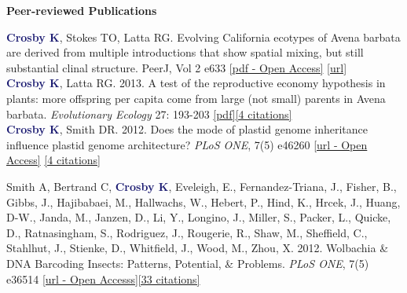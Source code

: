 \documentclass[a4paper,12pt,final]{memoir}
\newcommand{\Sep}{\vspace{1.5em}}
\newcommand{\SmallSep}{\vspace{0.5em}}
\newenvironment{Contact Information}
	{\ignorespaces\textbf{\color{MidnightBlue} Contact Information}}
	{\Sep\ignorespacesafterend}
\newcommand{\CVSection}[1]
	{\Large\textbf{#1}\par
	\SmallSep\normalsize\normalfont}
\begin{document}
\Sep

\CVSection{Peer-reviewed Publications}
\textcolor{MidnightBlue}{\textbf{{Crosby K}}}, Stokes TO, Latta RG. Evolving California ecotypes of Avena barbata are derived from multiple introductions that show spatial mixing, but still substantial clinal structure. PeerJ, Vol 2 e633 \href{https://peerj.com/articles/633.pdf}{[pdf - Open Access]} \href{http://dx.doi.org/10.7717/peerj.633}{[url]}\\

\textcolor{MidnightBlue}{\textbf{{Crosby K}}}, Latta RG. 2013. A test of the reproductive economy hypothesis in plants: more offspring per capita come from large (not small) parents in Avena barbata. \textit{Evolutionary Ecology} 27: 193-203 \href{https://www.researchgate.net/profile/Kate_Crosby/publication/257561503_A_test_of_the_reproductive_economy_hypothesis_in_plants_more_offspring_per_capita_come_from_large_\%28not_small\%29_parents_in_Avena_barbata/links/549893d20cf2519f5a1de721.pdf?origin=publication_detail}{[pdf]}\href{http://scholar.google.ca/scholar?oi=bibs&hl=en&cites=3740505222331803820&as_sdt=5}{[4 citations]}\\

\textcolor{MidnightBlue}{\textbf{{Crosby K}}}, Smith DR. 2012. Does the mode of plastid genome inheritance influence plastid genome architecture?  \textit{PLoS ONE}, 7(5) e46260 \href{http://www.plosone.org/article/info\%3Adoi\%2F10.1371\%2Fjournal.pone.0046260}{[url - Open Access]} \href{http://scholar.google.ca/scholar?oi=bibs&hl=en&cites=8775816063343348897&as_sdt=5}{[4 citations]}\\

\clearpage

Smith A, Bertrand C, \textcolor{MidnightBlue}{\textbf{{Crosby K}}},  Eveleigh, E., Fernandez-Triana, J., Fisher, B., Gibbs, J., Hajibabaei, M., Hallwachs, W., Hebert, P., Hind, K., Hrcek, J., Huang, D-W., Janda, M., Janzen, D., Li, Y., Longino, J., Miller, S., Packer, L., Quicke, D., Ratnasingham, S., Rodriguez, J., Rougerie, R., Shaw, M., Sheffield, C., Stahlhut, J., Stienke, D., Whitfield, J., Wood, M., Zhou, X.  2012. Wolbachia \& DNA Barcoding Insects: Patterns, Potential, \& Problems. \textit{PLoS ONE}, 7(5) e36514 \href{http://www.plosone.org/article/info\%3Adoi\%2F10.1371\%2Fjournal.pone.0036514#pone-0036514-g003}{[url - Open Accesss]}\href{http://scholar.google.ca/scholar?oi=bibs&hl=en&cites=16551803805181280857&as_sdt=5}{[33 citations]}
\\
\end{document}
